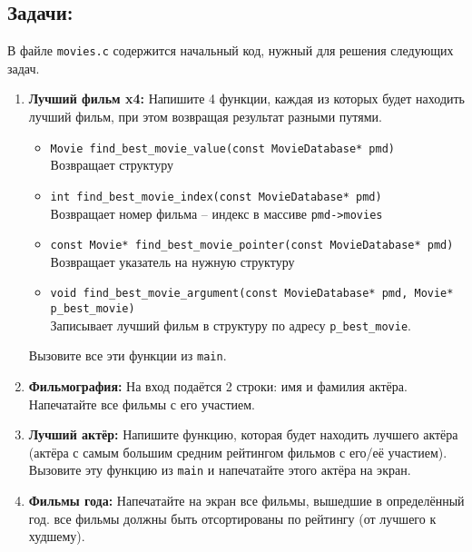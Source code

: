 \documentclass{article}
\begin{document}
\subsection*{Задачи:}
В файле \texttt{movies.c} содержится начальный код, нужный для решения следующих задач.
\begin{enumerate}
\item \textbf{Лучший фильм x4:} Напишите 4 функции, каждая из которых будет находить лучший фильм, при этом возвращая  результат разными путями. 
\begin{itemize}
\item \texttt{Movie find\_best\_movie\_value(const MovieDatabase* pmd)}\\
Возвращает структуру
\item \texttt{int find\_best\_movie\_index(const MovieDatabase* pmd)} \\
Возвращает номер фильма -- индекс в массиве \texttt{pmd->movies}
\item \texttt{const Movie* find\_best\_movie\_pointer(const MovieDatabase* pmd)}\\
Возвращает указатель на нужную структуру
\item \texttt{void find\_best\_movie\_argument(const MovieDatabase* pmd, Movie* p\_best\_movie)}\\
Записывает лучший фильм в структуру по адресу \texttt{p\_best\_movie}.
\end{itemize}
Вызовите все эти функции из \texttt{main}.
\item \textbf{Фильмография:} На вход подаётся 2 строки: имя и фамилия актёра. Напечатайте все фильмы с его участием.
\item \textbf{Лучший актёр:} Напишите функцию, которая будет находить лучшего актёра (актёра с самым большим средним рейтингом фильмов с его/её участием). Вызовите эту функцию из \texttt{main} и напечатайте этого актёра на экран.
\item \textbf{Фильмы года:} Напечатайте на экран все фильмы, вышедшие в определённый год. все фильмы должны быть отсортированы по рейтингу (от лучшего к худшему).
\end{enumerate}
\end{document}
